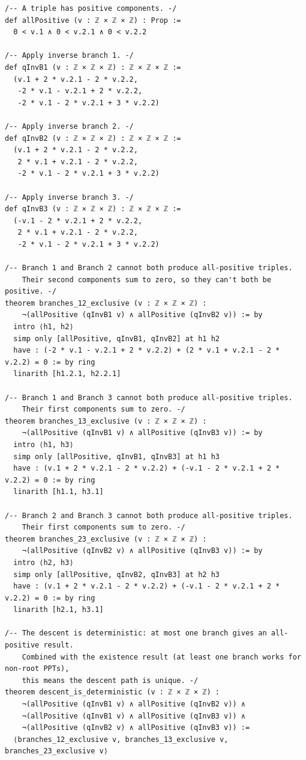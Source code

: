 \documentclass[11pt,openany]{book}
\theoremstyle{definition}
\theoremstyle{plain}
\theoremstyle{remark}
\begin{document}
\begin{lstlisting}[style=lean]
/-- A triple has positive components. -/
def allPositive (v : ℤ × ℤ × ℤ) : Prop :=
  0 < v.1 ∧ 0 < v.2.1 ∧ 0 < v.2.2

/-- Apply inverse branch 1. -/
def qInvB1 (v : ℤ × ℤ × ℤ) : ℤ × ℤ × ℤ :=
  (v.1 + 2 * v.2.1 - 2 * v.2.2,
   -2 * v.1 - v.2.1 + 2 * v.2.2,
   -2 * v.1 - 2 * v.2.1 + 3 * v.2.2)

/-- Apply inverse branch 2. -/
def qInvB2 (v : ℤ × ℤ × ℤ) : ℤ × ℤ × ℤ :=
  (v.1 + 2 * v.2.1 - 2 * v.2.2,
   2 * v.1 + v.2.1 - 2 * v.2.2,
   -2 * v.1 - 2 * v.2.1 + 3 * v.2.2)

/-- Apply inverse branch 3. -/
def qInvB3 (v : ℤ × ℤ × ℤ) : ℤ × ℤ × ℤ :=
  (-v.1 - 2 * v.2.1 + 2 * v.2.2,
   2 * v.1 + v.2.1 - 2 * v.2.2,
   -2 * v.1 - 2 * v.2.1 + 3 * v.2.2)

/-- Branch 1 and Branch 2 cannot both produce all-positive triples.
    Their second components sum to zero, so they can't both be positive. -/
theorem branches_12_exclusive (v : ℤ × ℤ × ℤ) :
    ¬(allPositive (qInvB1 v) ∧ allPositive (qInvB2 v)) := by
  intro ⟨h1, h2⟩
  simp only [allPositive, qInvB1, qInvB2] at h1 h2
  have : (-2 * v.1 - v.2.1 + 2 * v.2.2) + (2 * v.1 + v.2.1 - 2 * v.2.2) = 0 := by ring
  linarith [h1.2.1, h2.2.1]

/-- Branch 1 and Branch 3 cannot both produce all-positive triples.
    Their first components sum to zero. -/
theorem branches_13_exclusive (v : ℤ × ℤ × ℤ) :
    ¬(allPositive (qInvB1 v) ∧ allPositive (qInvB3 v)) := by
  intro ⟨h1, h3⟩
  simp only [allPositive, qInvB1, qInvB3] at h1 h3
  have : (v.1 + 2 * v.2.1 - 2 * v.2.2) + (-v.1 - 2 * v.2.1 + 2 * v.2.2) = 0 := by ring
  linarith [h1.1, h3.1]

/-- Branch 2 and Branch 3 cannot both produce all-positive triples.
    Their first components sum to zero. -/
theorem branches_23_exclusive (v : ℤ × ℤ × ℤ) :
    ¬(allPositive (qInvB2 v) ∧ allPositive (qInvB3 v)) := by
  intro ⟨h2, h3⟩
  simp only [allPositive, qInvB2, qInvB3] at h2 h3
  have : (v.1 + 2 * v.2.1 - 2 * v.2.2) + (-v.1 - 2 * v.2.1 + 2 * v.2.2) = 0 := by ring
  linarith [h2.1, h3.1]

/-- The descent is deterministic: at most one branch gives an all-positive result.
    Combined with the existence result (at least one branch works for non-root PPTs),
    this means the descent path is unique. -/
theorem descent_is_deterministic (v : ℤ × ℤ × ℤ) :
    ¬(allPositive (qInvB1 v) ∧ allPositive (qInvB2 v)) ∧
    ¬(allPositive (qInvB1 v) ∧ allPositive (qInvB3 v)) ∧
    ¬(allPositive (qInvB2 v) ∧ allPositive (qInvB3 v)) :=
  ⟨branches_12_exclusive v, branches_13_exclusive v, branches_23_exclusive v⟩

\end{lstlisting}
\end{document}
